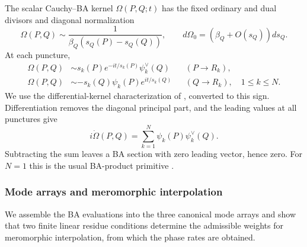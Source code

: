 The scalar Cauchy--BA kernel $\Omega(P,Q;t)$ has the fixed ordinary
and dual divisors and diagonal normalization
\begin{equation}\label{eq:general-kernel-normalization}
 \Omega(P,Q)\sim\frac1{\beta_Q(s_Q(P)-s_Q(Q))},\qquad
 d\Omega_0=(\beta_Q+O(s_Q))ds_Q.
\end{equation}
At each puncture,
\begin{equation}\label{eq:general-kernel-infinity}
\begin{aligned}
 \Omega(P,Q)&\sim s_k(P)e^{-it/s_k(P)}\psi_k^\vee(Q)
                                      &&(P\to R_k),\\
 \Omega(P,Q)&\sim-s_k(Q)\psi_k(P)e^{it/s_k(Q)}
                                      &&(Q\to R_k),\quad1\leq k\leq N.
\end{aligned}
\end{equation}
We use the differential-kernel characterization of
\cite[Definition~3.2 and (3.22)]{Bertola2021}, converted to this sign.
Differentiation removes the diagonal principal part, and the leading
values at all punctures give
\begin{equation}\label{eq:general-kernel-rate}
 i\dot\Omega(P,Q)=\sum_{k=1}^{N}\psi_k(P)\psi_k^\vee(Q).
\end{equation}
Subtracting the sum leaves a BA section with zero leading vector, hence
zero. For $N=1$ this is the usual BA-product primitive
\cite{GrinevichOrlov1989,AratynNissimovPacheva1997}.

\subsubsection{Mode arrays and meromorphic interpolation}
\label{sec:general-BA-interpolation}

We assemble the BA evaluations into the three canonical mode arrays
and show that two finite linear residue conditions determine the
admissible weights for meromorphic interpolation, from which the
phase rates are obtained.

